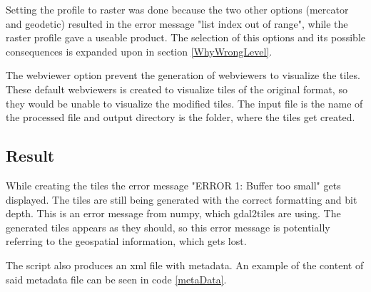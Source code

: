 Setting the profile to raster was done because the two other options (mercator and geodetic) resulted in the error message "list index out of range", while the raster profile gave a useable product. The selection of this options and its possible consequences is expanded upon in section \ref{WhyWrongLevel}.   

The webviewer option prevent the generation of webviewers to visualize the tiles. These default webviewers is created to visualize tiles of the original format, so they would be unable to visualize the modified tiles. 
The input file is the name of the processed file and output directory is the folder, where the tiles get created. 
\subsection{Result}

While creating the tiles the error message "ERROR 1: Buffer too small" gets displayed. The tiles are still being generated with the correct formatting and bit depth. This is an error message from numpy, which gdal2tiles are using. 
\citep{MoreThan8}
The generated tiles appears as they should, so this error message is potentially referring to the geospatial information, which gets lost.


The script also produces an xml file with metadata. An example of the content of said metadata file can be seen in code \ref{metaData}.

